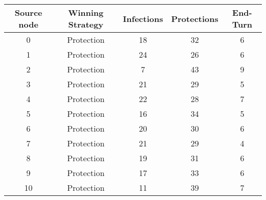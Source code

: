 \documentclass[results.tex]{subfiles}
\begin{document}
    \begin{center}
        \begin{tabular}{| c || c | c | c | c |}
            \hline
            {\bfseries Source node} & {\bfseries Winning Strategy} & {\bfseries Infections} & {\bfseries Protections}
            & {\bfseries End-Turn}
            \\  %
            \hline\hline
            0                       & Protection                   & 18                     & 32                      & 6                    \\
            \hline
            1                       & Protection                   & 24                     & 26                      & 6                    \\
            \hline
            2                       & Protection                   & 7                      & 43                      & 9                    \\
            \hline
            3                       & Protection                   & 21                     & 29                      & 5                    \\
            \hline
            4                       & Protection                   & 22                     & 28                      & 7                    \\
            \hline
            5                       & Protection                   & 16                     & 34                      & 5                    \\
            \hline
            6                       & Protection                   & 20                     & 30                      & 6                    \\
            \hline
            7                       & Protection                   & 21                     & 29                      & 4                    \\
            \hline
            8                       & Protection                   & 19                     & 31                      & 6                    \\
            \hline
            9                       & Protection                   & 17                     & 33                      & 6                    \\
            \hline
            10                      & Protection                   & 11                     & 39                      & 7                    \\

\end{tabular}
\end{center}
\end{document}
